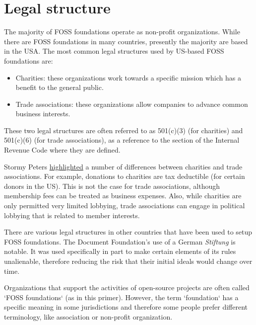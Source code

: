


\chapter{Legal structure}

The majority of FOSS foundations operate as non-profit organizations.  While there are FOSS foundations in many countries, presently the majority are based in the USA.  The most common legal structures used by US-based FOSS foundations are:

\begin{itemize}

\item Charities: these organizations work towards a specific mission which has a benefit to the general public.

\item Trade associations: these organizations allow companies to advance common business interests.

\end {itemize}

These two legal structures are often referred to as 501(c)(3) (for charities) and 501(c)(6) (for trade associations), as a reference to the section of the Internal Revenue Code where they are defined.

Stormy Peters \href{http://stormyscorner.com/2008/08/501c-3-versus-6.html}{highlighted} a number of differences between charities and trade associations.  For example, donations to charities are tax deductible (for certain donors in the US).  This is not the case for trade associations, although membership fees can be treated as business expenses.  Also, while charities are only permitted very limited lobbying, trade associations can engage in political lobbying that is related to member interests.

There are various legal structures in other countries that have been used to setup FOSS foundations.  The Document Foundation's use of a German \textit{Stiftung} is notable.  It was used specifically in part to make certain elements of its rules unalienable, therefore reducing the risk that their initial ideals would change over time.

\begin{kaobox}[frametitle=FOSS foundations: what's in a name?]

Organizations that support the activities of open-source projects are often called `FOSS foundations` (as in this primer).  However, the term `foundation` has a specific meaning in some jurisdictions and therefore some people prefer different terminology, like association or non-profit organization.

\end{kaobox}

